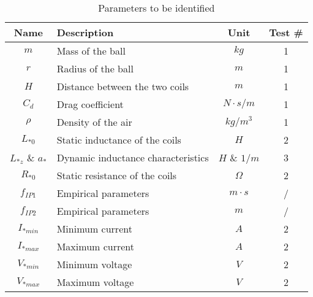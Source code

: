 \begin{table}[H]

    \centering
    \begin{tabular}{|c|l|c|c|}
        \hline
        \textbf{Name}     & \textbf{Description}               & \textbf{Unit} & \textbf{Test \#} \\
        \hline
        $m$               & Mass of the ball                   & $kg$          & 1                \\
        $r$               & Radius of the ball                 & $m$           & 1                \\
        $H$               & Distance between the two coils     & $m$           & 1                \\
        $C_d$             & Drag coefficient                   & $N \cdot s/m$ & 1                \\
        $\rho$            & Density of the air                 & $kg/m^3$      & 1                \\
        $L_{*0}$          & Static inductance of the coils     & $H$           & 2                \\
        $L_{*z}$ \& $a_*$ & Dynamic inductance characteristics & $H$ \& $1/m$  & 3                \\
        $R_{*0}$          & Static resistance of the coils     & $\Omega$      & 2                \\
        $f_{IP1}$         & Empirical parameters               & $m\cdot s$    & /                \\
        $f_{IP2}$         & Empirical parameters               & $m$           & /                \\
        $I_{*min}$        & Minimum current                    & $A$           & 2                \\
        $I_{*max}$        & Maximum current                    & $A$           & 2                \\
        $V_{*min}$        & Minimum voltage                    & $V$           & 2                \\
        $V_{*max}$        & Maximum voltage                    & $V$           & 2                \\
        \hline
    \end{tabular}

    \caption{Parameters to be identified}
    \label{tab:parameters_to_be_identified}

\end{table}


